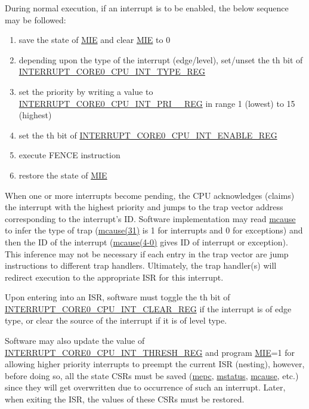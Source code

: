 \documentclass[main\_\_EN.tex]{subfiles}
\begin{document}
During normal execution, if an interrupt  is to be enabled, the below sequence may be followed:
\begin{enumerate}
    \item save the state of \hyperref[fielddesc:MSTATUSMIE]{MIE} and clear \hyperref[fielddesc:MSTATUSMIE]{MIE} to 0
    \item depending upon the type of the interrupt (edge/level), set/unset the th bit of \hyperref[regdesc:INTERRUPTCORE0CPUINTTYPEREG]{INTERRUPT\_CORE0\_CPU\_INT\_TYPE\_REG}
    \item set the priority by writing a value to \hyperref[regdesc:INTERRUPTCORE0CPUINTPRI0REG]{INTERRUPT\_CORE0\_CPU\_INT\_PRI\_\_REG} in range 1 (lowest) to 15 (highest)
    \item set the th bit of \hyperref[regdesc:INTERRUPTCORE0CPUINTENABLEREG]{INTERRUPT\_CORE0\_CPU\_INT\_ENABLE\_REG}
    \item execute FENCE instruction
    \item restore the state of \hyperref[fielddesc:MSTATUSMIE]{MIE}
\end{enumerate}

When one or more interrupts become pending, the CPU acknowledges (claims) the interrupt with the highest priority and jumps to the trap vector address corresponding to the interrupt's ID. Software implementation may read \hyperref[regdesc:MCAUSE]{mcause} to infer the type of trap (\hyperref[fielddesc:MCAUSEINT]{mcause(31)} is 1 for interrupts and 0 for exceptions) and then the ID of the interrupt (\hyperref[fielddesc:MCAUSECODE]{mcause(4-0)} gives ID of interrupt or exception). This inference may not be necessary if each entry in the trap vector are jump instructions to different trap handlers. Ultimately, the trap handler(s) will redirect execution to the appropriate ISR for this interrupt.

Upon entering into an ISR, software must toggle the th bit of \hyperref[regdesc:INTERRUPTCORE0CPUINTCLEARREG]{INTERRUPT\_CORE0\_CPU\_INT\_CLEAR\_REG} if the interrupt is of edge type, or clear the source of the interrupt if it is of level type.

Software may also update the value of \hyperref[regdesc:INTERRUPTCORE0CPUINTTHRESHREG]{INTERRUPT\_CORE0\_CPU\_INT\_THRESH\_REG} and program \hyperref[fielddesc:MSTATUSMIE]{MIE}=1 for allowing higher priority interrupts to preempt the current ISR (nesting), however, before doing so, all the state CSRs must be saved (\hyperref[regdesc:MEPC]{mepc}, \hyperref[regdesc:MSTATUS]{mstatus}, \hyperref[regdesc:MCAUSE]{mcause}, etc.) since they will get overwritten due to occurrence of such an interrupt. Later, when exiting the ISR, the values of these CSRs must be restored.
\end{document}
